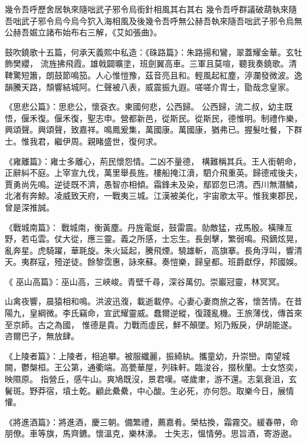 \begin{pinyinscope}
 幾令吾呼歷舍居執來隨咄武子邪令烏銜針相風其右其右
 幾令吾呼群議破葫執來隨吾咄武子邪令烏今烏今狖入海相風及後幾令吾呼無公赫吾執來隨吾咄武子邪令烏無公赫吾婮立諸布始布右三解，《艾如張曲》。



 鼓吹鐃歌十五篇，何承天義熙中私造：《硃路篇》：朱路揚和鸞，翠蓋耀金華。玄牡飾樊纓，
 流旌拂飛霞。雄戟闢曠塗，班劍翼高車。三軍且莫喧，聽我奏鐃歌。清鞞驚短簫，朗鼓節鳴笳。人心惟愷豫，茲音亮且和。輕風起紅塵，渟瀾發微波。逸韻騰天路，頹響結城阿。仁聲被八表，威震振九遐。嗟嗟介胄士，勖哉念皇家。



 《思悲公篇》：思悲公，懷袞衣。東國何悲，公西歸。
 公西歸，流二叔，幼主既悟，偃禾復。偃禾復，聖志申。營都新邑，從斯民。從斯民，德惟明。制禮作樂，興頌聲。興頌聲，致嘉祥。鳴鳳爰集，萬國康。萬國康，猶弗已。握髮吐餐，下群士。惟我君，繼伊周。親睹盛世，復何求。



 《雍離篇》：雍士多離心，荊民懷怨情。二凶不量德，
 構難稱其兵。王人銜朝命，正辭糾不庭。上宰宣九伐，萬里舉長旌。樓船掩江濆，駟介飛重英。歸德戒後夫，賈勇尚先鳴。逆徒既不濟，愚智亦相傾。霜鋒未及染，鄢郢忽已清。西川無潛鱗，北渚有奔鯨。凌威致天府，一戰夷三城。江漢被美化，宇宙歌太平。惟我東郡民，曾是深推誠。



 《戰城南篇》：
 戰城南，衡黃塵。丹旌電烻，鼓雷震。勍敵猛，戎馬殷。橫陳亙野，若屯雲。仗大從，應三靈。義之所感，士忘生。長劍擊，繁弱鳴。飛鏑炫晃，亂奔星。虎騎躍，華毦旋。朱火延起，騰飛煙。驍雄斬，高旗搴。長角浮叫，響清天。夷群寇，殪逆徒。餘黎霑惠，詠來蘇。奏愷樂，歸皇都。班爵獻俘，邦國娛。



 《
 巫山高篇》：巫山高，三峽峻。青壁千尋，深谷萬仞。崇巖冠靈，林冥冥。



 山禽夜響，晨猿相和鳴。洪波迅澓，載逝載停。心妻心妻商旅之客，懷苦情。在昔陽九，皇綱微。李氏竊命，宣武耀靈威。蠢爾逆縱，復踐亂機。王旅薄伐，傳首來至京師。古之為國，
 惟德是貴。力戰而虛民，鮮不顛墜。矧乃叛戾，伊胡能遂。咨爾巴子，無放肆。



 《上陵者篇》：上陵者，相追攀。被服纖麗，振綺紈。攜童幼，升崇巒。南望城闕，鬱槃桓。王公第，通衢端。高甍華屋，列硃軒。臨浚谷，掇秋蘭。士女悠奕，映隰原。
 指營丘，感牛山。爽鳩既沒，景君嘆。嗟歲聿，游不還。志氣衰沮，玄鬢斑。野莽宿，墳土乾。顧此纍纍，中心酸。生必死，亦何怨。取樂今日，展情懽。



 《將進酒篇》：將進酒，慶三朝。備繁禮，薦嘉肴。榮枯換，霜霧交。緩春帶，命朋僚。車等旗，馬齊鑣。懷溫克，樂林濠。
 士失志，慍情勞。思旨酒，寄游遨。




\end{pinyinscope}
